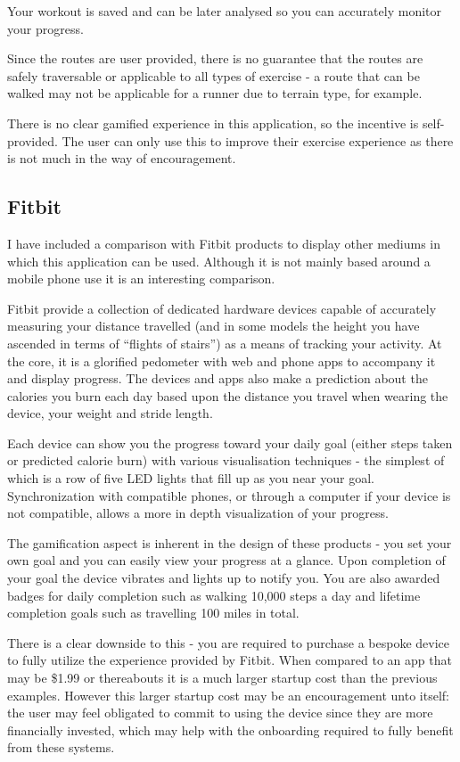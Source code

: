 Your workout is saved and can be later analysed so you can accurately
monitor your progress.

Since the routes are user provided, there is no guarantee that the
routes are safely traversable or applicable to all types of exercise -
a route that can be walked may not be applicable for a runner due to
terrain type, for example. 

There is no clear gamified experience in this application, so the
incentive is self-provided. The user can only use this to improve
their exercise experience as there is not much in the way of
encouragement. 

\subsection{Fitbit}
\label{sec:fitbit}
I have included a comparison with Fitbit products to display other
mediums in which this application can be used. Although it is not
mainly based around a mobile phone use it is an interesting comparison.

Fitbit provide a collection of dedicated hardware devices capable of
accurately measuring your distance travelled (and in some models the
height you have ascended in terms of ``flights of stairs'') as a means
of tracking your activity. At the core, it is a glorified pedometer
with web and phone apps to accompany it and display progress. The
devices and apps also make a prediction about the calories you burn each
day based upon the distance you travel when wearing the device, your
weight and stride length. 

Each device can show you the progress toward your daily goal (either
steps taken or predicted calorie burn) with various visualisation
techniques - the simplest of which is a row of five LED lights that
fill up as you near your goal. Synchronization with compatible phones,
or through a computer if your device is not compatible, allows a more
in depth visualization of your progress.

The gamification aspect is inherent in the design of these products -
you set your own goal and you can easily view your progress at a
glance. Upon completion of your goal the device vibrates and lights up
to notify you. You are also awarded badges for daily completion such
as walking 10,000 steps a day and lifetime completion goals such as
travelling 100 miles in total.

There is a clear downside to this - you are required to purchase a
bespoke device to fully utilize the experience provided by
Fitbit. When compared to an app that may be \$1.99 or thereabouts it is
a much larger startup cost than the previous examples. However this
larger startup cost may be an encouragement unto itself: the user may
feel obligated to commit to using the device since they are more
financially invested, which may help with the onboarding required to
fully benefit from these systems.

